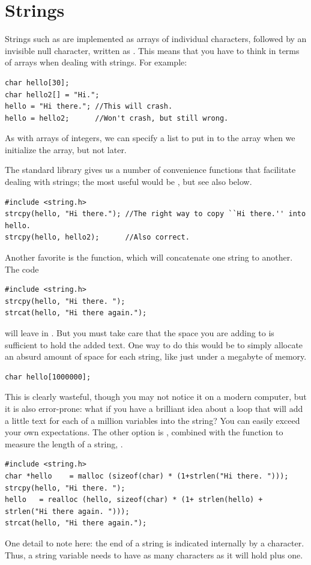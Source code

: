 \documentclass[12pt]{article}
\makeatletter
\def\ttind#1{\index{#1@\cinline{#1}}\cinline{#1}}
\makeatother
\begin{document}
\section{Strings} 

Strings such as  are implemented as arrays of individual characters, followed by an invisible
null character, written as . This means that you have to think in terms of arrays when dealing
with strings. For example:
\begin{lstlisting}
char hello[30];
char hello2[] = "Hi.";
hello = "Hi there."; //This will crash.
hello = hello2;      //Won't crash, but still wrong.
\end{lstlisting}

As with arrays of integers, we can specify a list to put in to the array when we initialize the array, but
not later.

The standard library gives us a number of convenience functions that facilitate dealing with strings; the
most useful would be \ttind{strcpy}, but see also  below.
\begin{lstlisting}
#include <string.h>
strcpy(hello, "Hi there."); //The right way to copy ``Hi there.'' into hello.
strcpy(hello, hello2);      //Also correct.
\end{lstlisting}

Another favorite is the  function, which will concatenate one
string to another. The code
\begin{lstlisting}
#include <string.h>
strcpy(hello, "Hi there. "); 
strcat(hello, "Hi there again."); 
\end{lstlisting}
will leave  in . But
you must take care that the space you are adding to is sufficient to
hold the added text. One way to do this would be to simply allocate an
absurd amount of space for each string, like just under a megabyte of
memory.
\begin{lstlisting}
char hello[1000000];
\end{lstlisting}
This is clearly wasteful, though you may not notice it on a modern
computer, but it is also error-prone: what if you have a brilliant idea
about a  loop that will add a little text for each of a
million variables into the string? You can easily exceed your own
expectations. The other option is , combined with the
function to measure the length of a string, .
\begin{lstlisting}
#include <string.h>
char *hello    = malloc (sizeof(char) * (1+strlen("Hi there. ")));
strcpy(hello, "Hi there. "); 
hello   = realloc (hello, sizeof(char) * (1+ strlen(hello) + strlen("Hi there again. ")));
strcat(hello, "Hi there again."); 
\end{lstlisting}
One detail to note here: the end of a string is indicated internally by
a  character. Thus, a string variable needs
to have as many characters as it will hold plus one.
\end{document}
